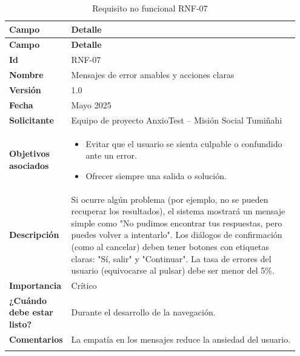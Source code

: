 \begin{longtable}{p{0.15\linewidth} p{0.80\linewidth}}
\toprule
\rowcolor{tableheader!20}
\textbf{Campo} & \textbf{Detalle} \\
\midrule
\endfirsthead
\rowcolor{tableheader!20}
\textbf{Campo} & \textbf{Detalle} \\
\midrule
\endhead
\bottomrule
\endfoot
\textbf{Id} & RNF-07 \\
\textbf{Nombre} & Mensajes de error amables y acciones claras \\
\textbf{Versión} & 1.0 \\
\textbf{Fecha} & Mayo 2025 \\
\textbf{Solicitante} & Equipo de proyecto AnxioTest – Misión Social Tumiñahi \\
\textbf{Objetivos asociados} & 
  \begin{itemize}
    \item Evitar que el usuario se sienta culpable o confundido ante un error.
    \item Ofrecer siempre una salida o solución.
  \end{itemize} \\
\textbf{Descripción} & Si ocurre algún problema (por ejemplo, no se pueden recuperar los resultados), el sistema mostrará un mensaje simple como "No pudimos encontrar tus respuestas, pero puedes volver a intentarlo". Los diálogos de confirmación (como al cancelar) deben tener botones con etiquetas claras: "Sí, salir" y "Continuar". La tasa de errores del usuario (equivocarse al pulsar) debe ser menor del 5\%. \\
\textbf{Importancia} & Crítico \\
\textbf{¿Cuándo debe estar listo?} & Durante el desarrollo de la navegación. \\
\textbf{Comentarios} & La empatía en los mensajes reduce la ansiedad del usuario. \\
\bottomrule
\caption{Requisito no funcional RNF-07}
\end{longtable}

